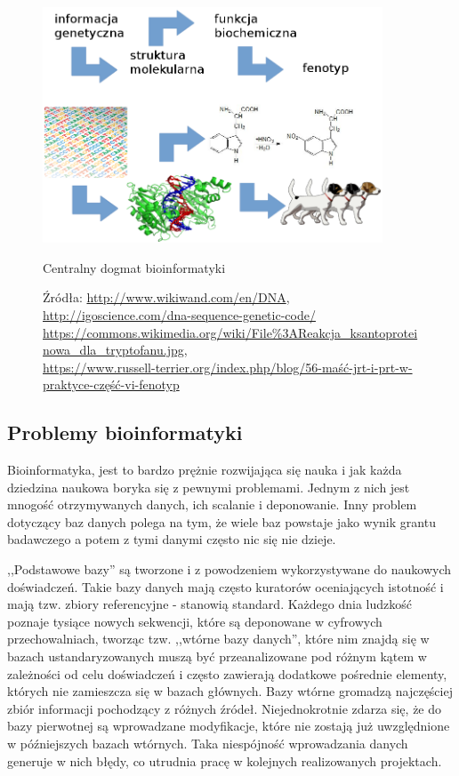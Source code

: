 \begin{figure}[h]
	\centering
	\includegraphics[width=0.9\textwidth]{img/centralny-dogmat.png}
	\caption{Centralny dogmat bioinformatyki}
	\vspace{-0.5cm}
	\caption*{\scriptsize Źródła: 
		\url{http://www.wikiwand.com/en/DNA},
		\url{http://igoscience.com/dna-sequence-genetic-code/} \\
		\url{https://commons.wikimedia.org/wiki/File\%3AReakcja\_ksantoproteinowa\_dla\_tryptofanu.jpg}, \\
		\url{https://www.russell-terrier.org/index.php/blog/56-maść-jrt-i-prt-w-praktyce-część-vi-fenotyp}
	}
	\label{img:centralny-dogmat}
\end{figure}

\subsection*{Problemy bioinformatyki}
Bioinformatyka, jest to bardzo prężnie rozwijająca się nauka i jak każda dziedzina naukowa boryka się z pewnymi problemami.
Jednym z nich jest mnogość otrzymywanych danych, ich scalanie i deponowanie.
Inny problem dotyczący baz danych polega na tym, że wiele baz powstaje jako wynik grantu badawczego a potem z tymi danymi często nic się nie dzieje.

,,Podstawowe bazy'' są tworzone i z powodzeniem wykorzystywane do naukowych doświadczeń.
Takie bazy danych mają często kuratorów oceniających istotność i mają tzw. zbiory referencyjne - stanowią standard.
Każdego dnia ludzkość poznaje tysiące nowych sekwencji, które są deponowane w cyfrowych przechowalniach, tworząc tzw. ,,wtórne bazy danych'', które nim znajdą się w bazach ustandaryzowanych muszą być przeanalizowane pod różnym kątem w zależności od celu doświadczeń i często zawierają dodatkowe pośrednie elementy, których nie zamieszcza się w bazach głównych.
Bazy wtórne gromadzą najczęściej zbiór informacji pochodzący z różnych źródeł.
Niejednokrotnie zdarza się, że do bazy pierwotnej są wprowadzane modyfikacje, które nie zostają już uwzględnione w późniejszych bazach wtórnych. 
Taka niespójność wprowadzania danych generuje w nich błędy, co utrudnia pracę w kolejnych realizowanych projektach.


